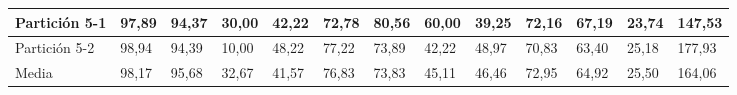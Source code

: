 \documentclass[10pt,a4paper]{article}
\begin{document}
\begin{table}[H]
{\begin{tabular}{l|l|l|l|l|l|l|l|l|l|l|l|l|}
\multicolumn{1}{|l|}{Partición 5-1} & 97,89        & 94,37         & 30,00   & 42,22 & 72,78        & 80,56         & 60,00   & 39,25 & 72,16        & 67,19         & 23,74   & 147,53 \\ \hline
\multicolumn{1}{|l|}{Partición 5-2} & 98,94        & 94,39         & 10,00   & 48,22 & 77,22        & 73,89         & 42,22   & 48,97 & 70,83        & 63,40         & 25,18   & 177,93 \\ \hline
\multicolumn{1}{|l|}{Media}         & 98,17        & 95,68         & 32,67   & 41,57 & 76,83        & 73,83         & 45,11   & 46,46 & 72,95        & 64,92         & 25,50   & 164,06 \\ \hline
\end{tabular}}
\end{table}

\end{document}
